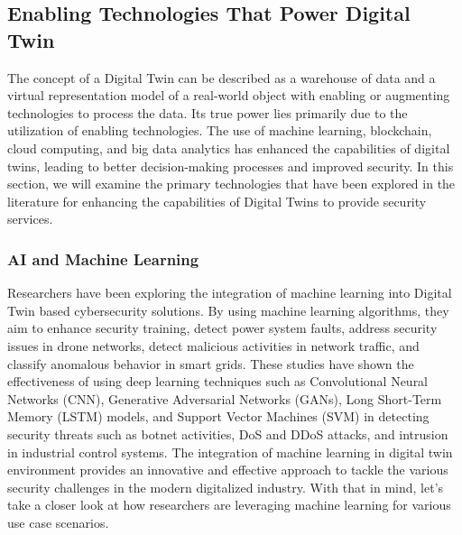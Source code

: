 
%
\subsection{Enabling Technologies That Power Digital Twin}
The concept of a Digital Twin can be described as a warehouse of data and a virtual representation model of a real-world object with enabling or augmenting technologies to process the data. Its true power lies primarily due to the utilization of enabling technologies\cite{sousaELEGANTSecurityCritical2021}. The use of machine learning, blockchain, cloud computing, and big data analytics has enhanced the capabilities of digital twins, leading to better decision-making processes and improved security. In this section, we will examine the primary technologies that have been explored in the literature for enhancing the capabilities of Digital Twins to provide security services.


\subsubsection{AI and Machine Learning}
Researchers have been exploring the integration of machine learning into Digital Twin based cybersecurity solutions. By using machine learning algorithms, they aim to enhance security training, detect power system faults, address security issues in drone networks, detect malicious activities in network traffic, and classify anomalous behavior in smart grids. These studies have shown the effectiveness of using deep learning techniques such as Convolutional Neural Networks (CNN), Generative Adversarial Networks (GANs), Long Short-Term Memory (LSTM) models, and Support Vector Machines (SVM) in detecting security threats such as botnet activities, DoS and DDoS attacks, and intrusion in industrial control systems. The integration of machine learning in digital twin environment provides an innovative and effective approach to tackle the various security challenges in the modern digitalized industry. With that in mind, let's take a closer look at how researchers are leveraging machine learning for various use case scenarios.  


